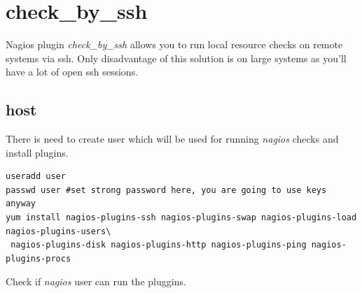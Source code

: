 \documentclass[10pt,a4paper,final]{report}
\begin{document}
\section{check\_by\_ssh}
Nagios plugin \emph{check\_by\_ssh} allows you to run local resource checks on remote systems via ssh. Only disadvantage of this solution is on large systems as you'll have a lot of open ssh sessions.
\subsection{host}
There is need to create user which will be used for running \emph{nagios} checks and install plugins.
\begin{lstlisting}
useradd user
passwd user #set strong password here, you are going to use keys anyway
yum install nagios-plugins-ssh nagios-plugins-swap nagios-plugins-load nagios-plugins-users\
 nagios-plugins-disk nagios-plugins-http nagios-plugins-ping nagios-plugins-procs
\end{lstlisting}
Check if \emph{nagios} user can run the pluggins.
\end{document}
